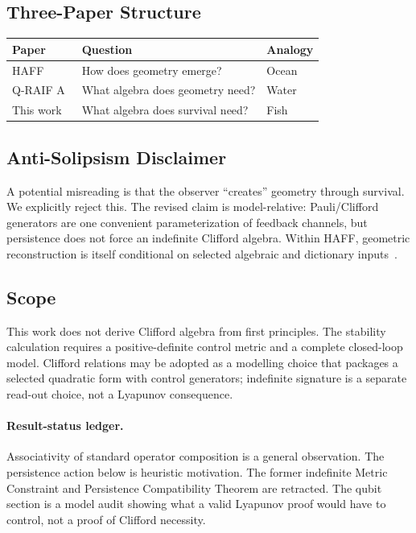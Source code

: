\documentclass[aps,pre,onecolumn,superscriptaddress,floatfix,longbibliography]{revtex4-2}
\begin{document}
\subsection{Three-Paper Structure}

\begin{center}
\begin{tabular}{@{}lll@{}}
\toprule
\textbf{Paper} & \textbf{Question} & \textbf{Analogy} \\
\midrule
HAFF~\cite{Liu2026PaperA} & How does geometry emerge? & Ocean \\
Q-RAIF A~\cite{Liu2026QRAIF_A} & What algebra does geometry need? & Water \\
This work & What algebra does survival need? & Fish \\
\bottomrule
\end{tabular}
\end{center}

\subsection{Anti-Solipsism Disclaimer}

A potential misreading is that the observer ``creates'' geometry through survival.
We explicitly reject this.
The revised claim is model-relative: Pauli/Clifford generators are one convenient parameterization of feedback channels, but persistence does not force an indefinite Clifford algebra.  Within HAFF, geometric reconstruction is itself conditional on selected algebraic and dictionary inputs~\cite{Liu2026PaperB}.

\subsection{Scope}

This work does not derive Clifford algebra from first principles.  The stability calculation requires a positive-definite control metric and a complete closed-loop model.  Clifford relations may be adopted as a modelling choice that packages a selected quadratic form with control generators; indefinite signature is a separate read-out choice, not a Lyapunov consequence.

\paragraph{Result-status ledger.}
Associativity of standard operator composition is a general observation.  The persistence action below is heuristic motivation.  The former indefinite Metric Constraint and Persistence Compatibility Theorem are retracted.  The qubit section is a model audit showing what a valid Lyapunov proof would have to control, not a proof of Clifford necessity.
\end{document}

